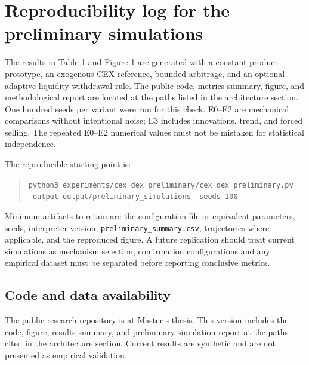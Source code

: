 \section{Reproducibility log for the preliminary simulations}

The results in Table 1 and Figure 1 are generated with a constant-product prototype,
an exogenous CEX reference, bounded arbitrage, and an optional adaptive liquidity
withdrawal rule. The public code, metrics summary, figure, and methodological report
are located at the paths listed in the architecture section. One hundred seeds per
variant were run for this check. E0--E2 are mechanical comparisons without intentional
noise; E3 includes innovations, trend, and forced selling. The repeated E0--E2
numerical values must not be mistaken for statistical independence.

The reproducible starting point is:

\begin{quote}
\texttt{python3 experiments/cex\_dex\_preliminary/cex\_dex\_preliminary.py}\\
\texttt{--output output/preliminary\_simulations --seeds 100}
\end{quote}

Minimum artifacts to retain are the configuration file or equivalent parameters,
seeds, interpreter version, \texttt{preliminary\_summary.csv}, trajectories where
applicable, and the reproduced figure. A future replication should treat current
simulations as mechanism selection; confirmation configurations and any empirical
dataset must be separated before reporting conclusive metrics.

\subsection*{Code and data availability}

The public research repository is at
\href{https://github.com/edwardcalderon/Master-s-thesis}{Master-s-thesis}. This version
includes the code, figure, results summary, and preliminary simulation report at the
paths cited in the architecture section. Current results are synthetic and are not
presented as empirical validation.
